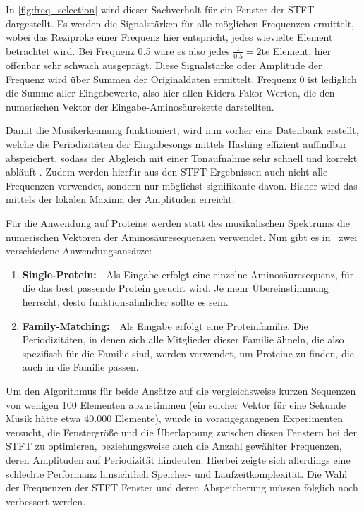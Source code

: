     In \autoref{fig:freq_selection} wird dieser Sachverhalt für ein Fenster der STFT dargestellt. Es werden die Signalstärken für alle möglichen Frequenzen ermittelt, wobei das Reziproke einer Frequenz hier entspricht, jedes wievielte Element betrachtet wird. Bei Frequenz 0.5 wäre es also jedes $\frac{1}{0.5} = 2$te Element, hier offenbar sehr schwach ausgeprägt. Diese Signalstärke oder Amplitude der Frequenz wird über Summen der Originaldaten ermittelt. Frequenz 0 ist lediglich die Summe aller Eingabewerte, also hier allen Kidera-Fakor-Werten, die den numerischen Vektor der Eingabe-Aminosäurekette darstellten.

    Damit die Musikerkennung funktioniert, wird nun vorher eine Datenbank erstellt, welche die Periodizitäten der Eingabesongs mittels Hashing effizient auffindbar abspeichert, sodass der Abgleich mit einer Tonaufnahme sehr schnell und korrekt abläuft . Zudem werden hierfür aus den STFT-Ergebnissen auch nicht alle Frequenzen verwendet, sondern nur möglichst signifikante davon. Bisher wird das mittels der lokalen Maxima der Amplituden erreicht.

    Für die Anwendung auf Proteine werden statt des musikalischen Spektrums die numerischen Vektoren der Aminosäuresequenzen verwendet. Nun gibt es in \protfin\ zwei verschiedene Anwendungsansätze:
    \begin{enumerate}
        \item \textbf{Single-Protein:}\ \ Als Eingabe erfolgt eine einzelne Aminosäuresequenz, für die das best passende Protein gesucht wird. Je mehr Übereinstimmung herrscht, desto funktionsähnlicher sollte es sein.
        \item \textbf{Family-Matching:}\ \ Als Eingabe erfolgt eine Proteinfamilie. Die Periodizitäten, in denen sich alle Mitglieder dieser Familie ähneln, die also spezifisch für die Familie sind, werden verwendet, um Proteine zu finden, die auch in die Familie passen.
    \end{enumerate}
    \label{kurze_sequenzen}
    Um den Algorithmus für beide Ansätze auf die vergleichsweise kurzen Sequenzen von wenigen 100 Elementen abzustimmen (ein solcher Vektor für eine Sekunde Musik hätte etwa 40.000 Elemente), wurde in vorangegangenen Experimenten versucht, die Fenstergröße und die Überlappung zwischen diesen Fenstern bei der STFT zu optimieren, beziehungsweise auch die Anzahl gewählter Frequenzen, deren Amplituden auf Periodizität hindeuten. Hierbei zeigte sich allerdings eine schlechte Performanz hinsichtlich Speicher- und Laufzeitkomplexität. Die Wahl der Frequenzen der STFT Fenster und deren Abspeicherung müssen folglich noch verbessert werden.

